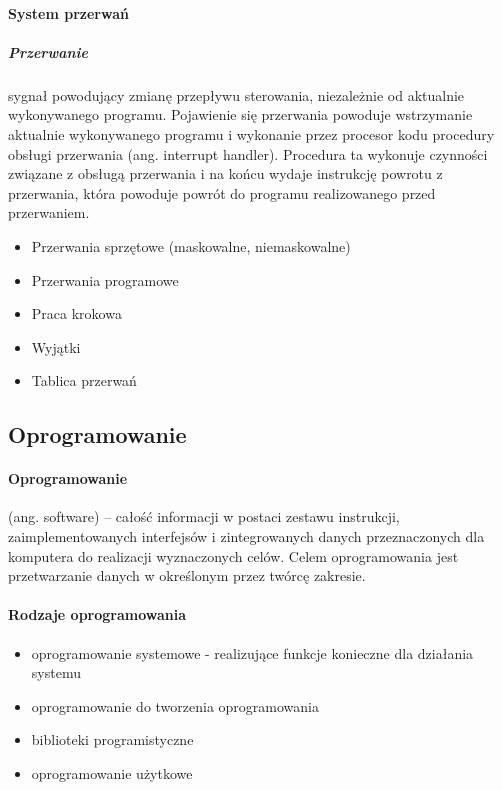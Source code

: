\documentclass[]{report}
\begin{document}
\paragraph{System przerwań}


\subparagraph{Przerwanie} sygnał powodujący zmianę przepływu sterowania, niezależnie od aktualnie wykonywanego programu. Pojawienie się przerwania powoduje wstrzymanie aktualnie wykonywanego programu i wykonanie przez procesor kodu procedury obsługi przerwania (ang. interrupt handler). Procedura ta wykonuje czynności związane z obsługą przerwania i na końcu wydaje instrukcję powrotu z przerwania, która powoduje powrót do programu realizowanego przed przerwaniem.



\begin{itemize}
\item Przerwania sprzętowe (maskowalne, niemaskowalne)
\item Przerwania programowe
\item Praca krokowa
\item Wyjątki
\item Tablica przerwań

\end{itemize}

\subsection{Oprogramowanie}

\paragraph{Oprogramowanie} (ang. software) – całość informacji w postaci zestawu instrukcji, zaimplementowanych interfejsów i zintegrowanych danych przeznaczonych dla komputera do realizacji wyznaczonych celów. Celem oprogramowania jest przetwarzanie danych w określonym przez twórcę zakresie.


\paragraph{Rodzaje oprogramowania \medskip}

\begin{itemize}
\item oprogramowanie systemowe - realizujące funkcje konieczne dla działania systemu
\item oprogramowanie do tworzenia oprogramowania
\item biblioteki programistyczne 
\item oprogramowanie użytkowe
\end{itemize}
\end{document}

